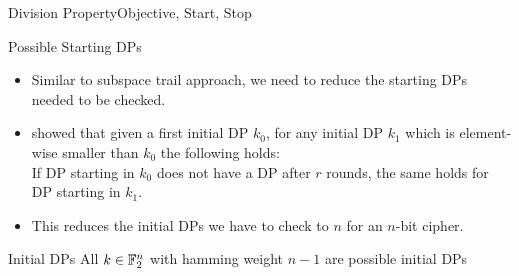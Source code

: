 \begin{frame}{Division Property}{Objective, Start, Stop}
    \begin{block}{Possible Starting DPs}
        \begin{itemize}
            \item Similar to subspace trail approach, we need to reduce the starting DPs needed to be checked.
            \item \cite[Proposition~2]{AC:SunWanWan17} showed that given a first initial DP $k_0$, for any initial DP $k_1$ which is element-wise smaller than $k_0$ the following holds:\\
                  If DP starting in $k_0$ does not have a DP after $r$ rounds, the same holds for DP starting in $k_1$.
            \item This reduces the initial DPs we have to check to $n$ for an $n$-bit cipher.
          \end{itemize}
    \end{block}
    \pause
    \begin{block}{Initial DPs}
        \centering
        All $k \in \mathbb{F}_2^n$ with hamming weight $n-1$ are possible initial DPs
    \end{block}
\end{frame}

